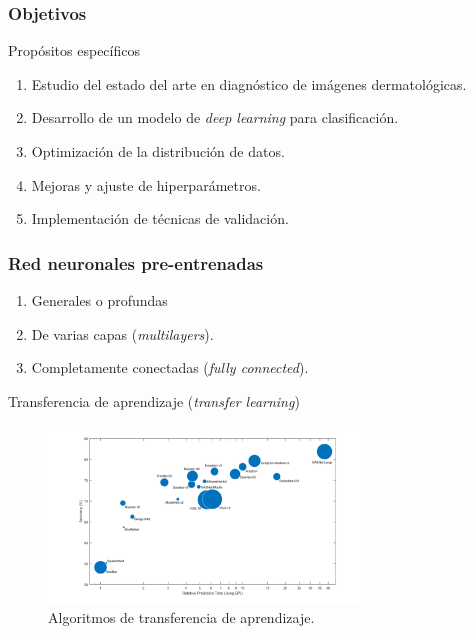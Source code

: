 \documentclass{beamer}
\begin{document}
\begin{frame}
  \frametitle{Objetivos}

    \begin{block}{Propósitos específicos}
      \small
      \begin{enumerate}
        \item<0-> Estudio del estado del arte en diagnóstico de imágenes dermatológicas.
        \item<0> Desarrollo de un modelo de \textit{deep learning} para clasificación.
        \item<0> Optimización de la distribución de datos.
        \item<0> Mejoras y ajuste de hiperparámetros.
        \item<0> Implementación de técnicas de validación.
      \end{enumerate}
    \end{block}
\end{frame}

\begin{frame}
  \frametitle{Red neuronales pre-entrenadas}

  \begin{enumerate}
    \small
    \item Generales o profundas
    \item De varias capas (\textit{multilayers}).
    \item Completamente conectadas (\textit{fully connected}).
  \end{enumerate}


  \begin{block}{Transferencia de aprendizaje (\textit{transfer learning})}
    \begin{figure}[H]
      \begin{center}
        \includegraphics[width=0.75\textwidth]{./Graphics/pre-trained-cnn.drawio.png}
        \caption{Algoritmos de transferencia de aprendizaje.}
        \label{fig:pre-trained}
      \end{center}
    \end{figure}
  \end{block}
\end{frame}
\end{document}

